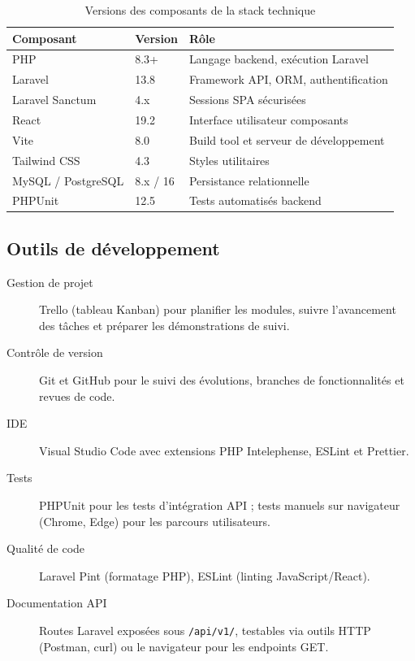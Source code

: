 \begin{table}[H]
\caption{Versions des composants de la stack technique}
\label{tab:stack_versions}
\centering
\small
\begin{tabular}{|l|l|p{6.5cm}|}
\hline
\textbf{Composant} & \textbf{Version} & \textbf{Rôle} \\
\hline
PHP & 8.3+ & Langage backend, exécution Laravel \\
\hline
Laravel & 13.8 & Framework API, ORM, authentification \\
\hline
Laravel Sanctum & 4.x & Sessions SPA sécurisées \\
\hline
React & 19.2 & Interface utilisateur composants \\
\hline
Vite & 8.0 & Build tool et serveur de développement \\
\hline
Tailwind CSS & 4.3 & Styles utilitaires \\
\hline
MySQL / PostgreSQL & 8.x / 16 & Persistance relationnelle \\
\hline
PHPUnit & 12.5 & Tests automatisés backend \\
\hline
\end{tabular}
\end{table}

\subsection{Outils de développement}

\begin{description}
  \item[Gestion de projet] Trello (tableau Kanban) pour planifier les modules,
  suivre l'avancement des tâches et préparer les démonstrations de suivi.
  \item[Contrôle de version] Git et GitHub pour le suivi des évolutions, branches de
  fonctionnalités et revues de code.
  \item[IDE] Visual Studio Code avec extensions PHP Intelephense, ESLint et Prettier.
  \item[Tests] PHPUnit pour les tests d'intégration API ; tests manuels sur navigateur
  (Chrome, Edge) pour les parcours utilisateurs.
  \item[Qualité de code] Laravel Pint (formatage PHP), ESLint (linting JavaScript/React).
  \item[Documentation API] Routes Laravel exposées sous \texttt{/api/v1/}, testables via
  outils HTTP (Postman, curl) ou le navigateur pour les endpoints GET.
\end{description}

